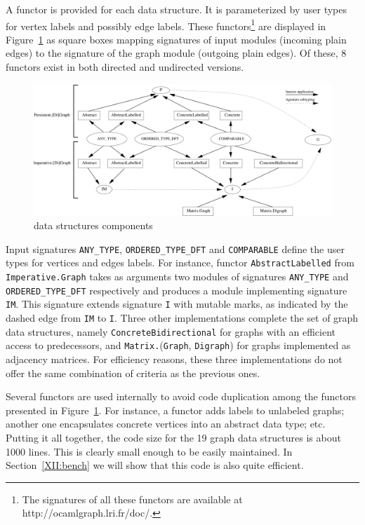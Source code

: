 A functor is provided for each data structure. It is parameterized by
user types for vertex labels and possibly edge labels. These
functors\footnote{The signatures of all these functors are 
  available at \textrm{http://ocamlgraph.lri.fr/doc/}.} 
are displayed in Figure~\ref{XII:fig:interfaces} as square boxes mapping
signatures of input modules (incoming plain edges) to the signature of
the graph module (outgoing plain edges). 
Of these, 8 functors exist in both directed and undirected versions.
\begin{figure}
  \centering
  \includegraphics[width=\textwidth]{interface.pdf}    
  \caption{\ocamlgraph data structures components}\label{XII:fig:interfaces}
\end{figure}
Input signatures \texttt{ANY\_TYPE}, \texttt{ORDERED\_TYPE\_DFT} and
\texttt{COMPARABLE} define the user types for vertices and edges
labels. For instance, functor
\texttt{AbstractLabelled} from \texttt{Imperative.Graph} takes as
arguments two modules of signatures \texttt{ANY\_TYPE} and
\texttt{ORDERED\_TYPE\_DFT} respectively and produces a module implementing
signature \texttt{IM}. This signature extends signature \texttt{I} with
mutable marks, as indicated by the dashed edge from \texttt{IM} to
\texttt{I}. 
Three other implementations complete the set of graph
data structures, namely \texttt{ConcreteBidirectional} for graphs with
an efficient access to predecessors, and
\texttt{Matrix.}(\texttt{Graph}, \texttt{Digraph}) for graphs
implemented as adjacency matrices. For efficiency reasons, these three
implementations do not offer the same combination of criteria as the
previous ones.

Several functors are used internally to avoid code duplication among the
functors presented in Figure~\ref{XII:fig:interfaces}. For instance, a
functor adds labels to 
unlabeled graphs; another one encapsulates concrete vertices into an
abstract data type; etc.  Putting it all together, the code size for
the 19 graph data structures is about 1000 lines. This is clearly
small enough to be easily maintained. In Section~\ref{XII:bench} we will
show that this code is also quite efficient.

